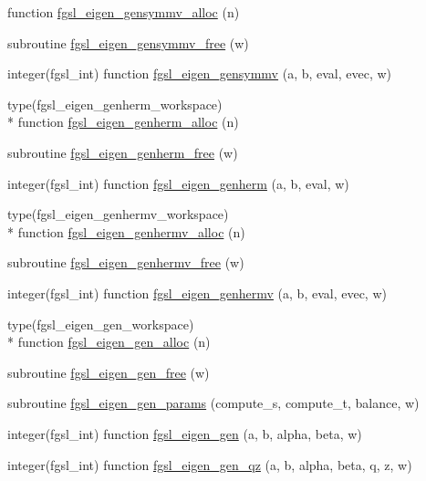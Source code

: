 \begin{DoxyCompactItemize}
function \hyperlink{eigen_8finc_aaf9f9b1f18094f6300da921900b946fa}{fgsl\-\_\-eigen\-\_\-gensymmv\-\_\-alloc} (n)
\item 
subroutine \hyperlink{eigen_8finc_ad60f54bc4c9afe52b1643a53ac4debf0}{fgsl\-\_\-eigen\-\_\-gensymmv\-\_\-free} (w)
\item 
integer(fgsl\-\_\-int) function \hyperlink{eigen_8finc_ad9e2195ef21d925f7e963185cb59e435}{fgsl\-\_\-eigen\-\_\-gensymmv} (a, b, eval, evec, w)
\item 
type(fgsl\-\_\-eigen\-\_\-genherm\-\_\-workspace) \\*
function \hyperlink{eigen_8finc_af69d430a7febbfb70b4021a765d9535d}{fgsl\-\_\-eigen\-\_\-genherm\-\_\-alloc} (n)
\item 
subroutine \hyperlink{eigen_8finc_a6c25ef96c06da3c1ff3926200f36e55b}{fgsl\-\_\-eigen\-\_\-genherm\-\_\-free} (w)
\item 
integer(fgsl\-\_\-int) function \hyperlink{eigen_8finc_a7742445ebb20b3ce43ece2c8ce92b3cb}{fgsl\-\_\-eigen\-\_\-genherm} (a, b, eval, w)
\item 
type(fgsl\-\_\-eigen\-\_\-genhermv\-\_\-workspace) \\*
function \hyperlink{eigen_8finc_a757b1df46b9949413e56c2fb40193358}{fgsl\-\_\-eigen\-\_\-genhermv\-\_\-alloc} (n)
\item 
subroutine \hyperlink{eigen_8finc_a0f8e68362cb297494a149a2abd529499}{fgsl\-\_\-eigen\-\_\-genhermv\-\_\-free} (w)
\item 
integer(fgsl\-\_\-int) function \hyperlink{eigen_8finc_a234ce4166943e7c9fbdf662554831bc4}{fgsl\-\_\-eigen\-\_\-genhermv} (a, b, eval, evec, w)
\item 
type(fgsl\-\_\-eigen\-\_\-gen\-\_\-workspace) \\*
function \hyperlink{eigen_8finc_a93910023619c9d669e02f83b9109c26b}{fgsl\-\_\-eigen\-\_\-gen\-\_\-alloc} (n)
\item 
subroutine \hyperlink{eigen_8finc_acf1f0d8398d2124aaaf77d87fc4f97af}{fgsl\-\_\-eigen\-\_\-gen\-\_\-free} (w)
\item 
subroutine \hyperlink{eigen_8finc_ad892f962a1ec3cab90f26ef37668e631}{fgsl\-\_\-eigen\-\_\-gen\-\_\-params} (compute\-\_\-s, compute\-\_\-t, balance, w)
\item 
integer(fgsl\-\_\-int) function \hyperlink{eigen_8finc_af9248a86edc3501913a04bff373f5f16}{fgsl\-\_\-eigen\-\_\-gen} (a, b, alpha, beta, w)
\item 
integer(fgsl\-\_\-int) function \hyperlink{eigen_8finc_abe397b833eedb3cba80d2abde013bbe4}{fgsl\-\_\-eigen\-\_\-gen\-\_\-qz} (a, b, alpha, beta, q, z, w)

\end{DoxyCompactItemize}
